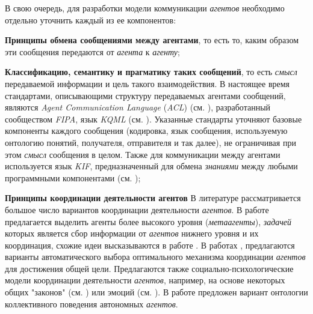 В свою очередь, для разработки модели коммуникации \textit{агентов} необходимо отдельно уточнить каждый из ее компонентов:

\begin{textitemize}
\item \textbf{Принципы обмена сообщениями между агентами}, то есть то, каким образом эти сообщения передаются от \textit{агента} к \textit{агенту};
\item \textbf{Классификацию, семантику и прагматику таких сообщений}, то есть \textit{смысл} передаваемой информации и цель такого взаимодействия. В настоящее время стандартами, описывающими структуру передаваемых агентами сообщений, являются \textit{Agent Communication Language} (\textit{ACL}) (см. ), разработанный сообществом \textit{FIPA}, язык \textit{KQML} (см. ). Указанные стандарты уточняют базовые компоненты каждого сообщения (кодировка, язык сообщения, используемую онтологию понятий, получателя, отправителя и так далее), не ограничивая при этом \textit{смысл} сообщения в целом. Также для коммуникации между агентами используется язык \textit{KIF}, предназначенный для обмена \textit{знаниями} между любыми программными компонентами (см. ); 
\item \textbf{Принципы координации деятельности агентов}
В литературе рассматривается большое число вариантов координации деятельности \textit{агентов}. В работе  предлагается выделить агенты более высокого уровня (\textit{метаагенты}), \textit{задачей} которых является сбор информации от \textit{агентов} нижнего уровня и их координация, схожие идеи высказываются в работе . В работах ,  предлагаются варианты автоматического выбора оптимального механизма координации \textit{агентов} для достижения общей цели. Предлагаются также социально-психологические модели координации деятельности \textit{агентов}, например, на основе некоторых общих "законов"{} (см. ) или эмоций (см. ). В работе  предложен вариант онтологии коллективного поведения автономных \textit{агентов}.
\end{textitemize}

